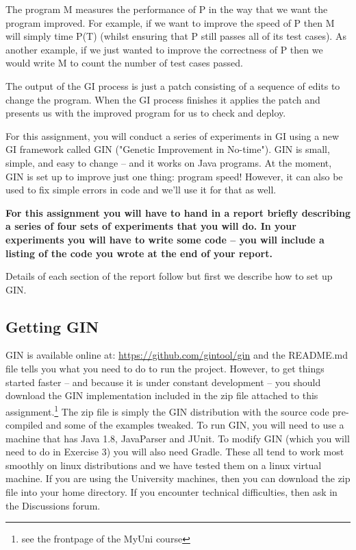 \documentclass{pracs}
\begin{document}
The program M measures the performance of P in the way that we want the program improved. For example, if we want to improve the speed of P then M will simply time P(T) (whilst ensuring that P still passes all of its test cases). As another example, if we just wanted to improve the correctness of P then we would write M to count the number of test cases passed. 

The output of the GI process is just a patch consisting of a sequence of edits to change the program. When the GI process finishes it applies the patch and presents us with the improved program for us to check and deploy. 

For this assignment, you will conduct a series of experiments in GI using a new GI framework called GIN ("Genetic Improvement in No-time"). GIN is small, simple, and  easy to change -- and it works on Java programs. At the moment, GIN is set up to improve just one thing: program speed! However, it can also be used to fix simple errors in code and we'll use it for that as well. 

\textbf{For this assignment you will have to hand in a report briefly describing a series of four sets of experiments that you will do. In your experiments you will have to write some code -- you will include a listing of the code you wrote at the end of your report. }

Details of each section of the report follow but first we describe how to set up GIN.

\subsection*{Getting GIN}
GIN is available online at: \url{https://github.com/gintool/gin} and the README.md file tells you what you need to do to run the project. However, to get things started faster -- and because it is under constant development -- you should download the GIN implementation included in the zip file attached to this assignment.\footnote{see the frontpage of the MyUni course} The zip file is simply the GIN distribution with the source code pre-compiled and some of the examples tweaked. To run GIN, you will need to use a machine that has Java 1.8, JavaParser and JUnit. To modify GIN (which you will need to do in Exercise 3) you will also need Gradle. These all tend to work most smoothly on linux distributions and we have tested them on a linux virtual machine. If you are using the University machines, then you can download the zip file into your home directory. If you encounter technical difficulties, then ask in the Discussions forum.
\end{document}
